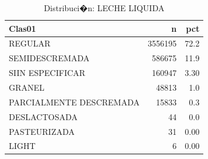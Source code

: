 \begin{table}[ht]
\centering
\caption{Distribuci�n:  LECHE LIQUIDA} 
\label{tab: LECHE_LIQUIDA}
\begin{tabular}{lrr}
  \hline
Clas01 & n & pct \\ 
  \hline
REGULAR  & 3556195 & 72.2 \\ 
  SEMIDESCREMADA & 586675 & 11.9 \\ 
   SIIN ESPECIFICAR& 160947 & 3.30 \\ 
  GRANEL & 48813 & 1.0 \\ 
  PARCIALMENTE DESCREMADA & 15833 & 0.3 \\ 
   DESLACTOSADA & 44 & 0.0 \\ 
  PASTEURIZADA & 31 & 0.00 \\ 
  LIGHT & 6 & 0.00 \\ 
   \hline
\end{tabular}
\end{table}
